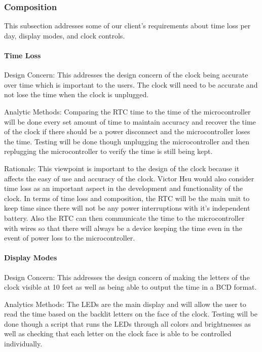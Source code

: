 \documentclass[onecolumn, draftclsnofoot,10pt, compsoc]{IEEEtran}
\begin{document}
\subsubsection{Composition}
This subsection addresses some of our client's requirements about time loss per day, display modes, and clock controls.

\paragraph{Time Loss}
\vspace{2mm} Design Concern: This addresses the design concern of the clock being accurate over time which is important to the users.
The clock will need to be accurate and not lose the time when the clock is unplugged.

\vspace{2mm} Analytic Methods: Comparing the RTC time to the time of the microcontroller will be done every set amount of time to maintain accuracy and recover the time of the clock if there should be a power disconnect and the microcontroller loses the time.
Testing will be done though unplugging the microcontroller and then replugging the microcontroller to verify the time is still being kept.

\vspace{2mm} Rationale: This viewpoint is important to the design of the clock because it affects the easy of use and accuracy of the clock.
Victor Hsu would also consider time loss as an important aspect in the development and functionality of the clock.
In terms of time loss and composition, the RTC will be the main unit to keep time since there will not be any power interruptions with it's independent battery.
Also the RTC can then communicate the time to the microcontroller with wires so that there will always be a device keeping the time even in the event of power loss to the microcontroller.

\paragraph{Display Modes}
\vspace{2mm} Design Concern: This addresses the design concern of making the letters of the clock visible at 10 feet as well as being able to output the time in a BCD format.

\vspace{2mm} Analytics Methods: The LEDs are the main display and will allow the user to read the time based on the backlit letters on the face of the clock.
Testing will be done though a script that runs the LEDs through all colors and brightnesses as well as checking that each letter on the clock face is able to be controlled individually.
\end{document}
